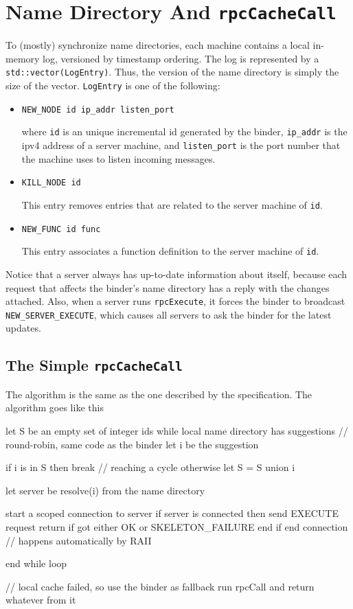 \section{Name Directory And {\tt rpcCacheCall}}
To (mostly) synchronize name directories, each machine contains a local in-memory log, versioned by timestamp ordering.
The log is represented by a {\tt std::vector(LogEntry)}.
Thus, the version of the name directory is simply the size of the vector.
{\tt LogEntry} is one of the following:

\begin{itemize}
\item
\begin{verbatim}
NEW_NODE id ip_addr listen_port
\end{verbatim}
where {\tt id} is an unique incremental id generated by the binder, {\tt ip\_addr} is the ipv4 address of a server machine, and {\tt listen\_port} is the port number that the machine uses to listen incoming messages.
\item
\begin{verbatim}
KILL_NODE id
\end{verbatim}
This entry removes entries that are related to the server machine of {\tt id}.
\item
\begin{verbatim}
NEW_FUNC id func
\end{verbatim}
This entry associates a function definition to the server machine of {\tt id}.
\end{itemize}

Notice that a server always has up-to-date information about itself, because each request that affects the binder's name directory has a reply with the changes attached.
Also, when a server runs {\tt rpcExecute}, it forces the binder to broadcast {\tt NEW\_SERVER\_EXECUTE}, which causes all servers to ask the binder for the latest updates.

\subsection{The Simple \tt rpcCacheCall}
The algorithm is the same as the one described by the specification.
The algorithm goes like this
\begin{algorithm}
let S be an empty set of integer ids
while local name directory has suggestions
	// round-robin, same code as the binder
	let i be the suggestion

	if i is in S then break // reaching a cycle
	otherwise let S = S union {i}

	let server be resolve(i) from the name directory

	start a scoped connection to server
		if server is connected then
			send EXECUTE request
			return if got either OK or SKELETON_FAILURE
		end if
	end connection // happens automatically by RAII

end while loop

// local cache failed, so use the binder as fallback
run rpcCall and return whatever from it
\end{algorithm}

